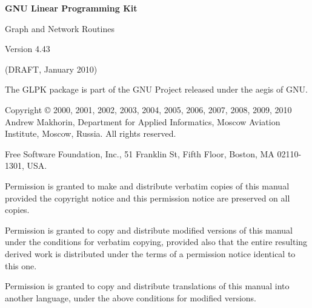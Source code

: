 \documentclass[dvipdfm,11pt]{report}
\begin{document}
\thispagestyle{empty}

\begin{center}

\vspace*{1in}

\begin{huge}
\sf\bfseries GNU Linear Programming Kit
\end{huge}

\vspace{0.5in}

\begin{LARGE}
\sf Graph and Network Routines
\end{LARGE}

\vspace{0.5in}

\begin{LARGE}
\sf Version 4.43
\end{LARGE}

\vspace{0.5in}
\begin{Large}
\sf (DRAFT, January 2010)
\end{Large}
\end{center}

\newpage

\vspace*{1in}

\vfill

\noindent
The GLPK package is part of the GNU Project released under the aegis of
GNU.

\medskip \noindent
Copyright \copyright{} 2000, 2001, 2002, 2003, 2004, 2005, 2006, 2007,
2008, 2009, 2010 Andrew Makhorin, Department for Applied Informatics,
Moscow Aviation Institute, Moscow, Russia. All rights reserved.

\medskip \noindent
Free Software Foundation, Inc., 51 Franklin St, Fifth Floor, Boston, MA
02110-1301, USA.

\medskip \noindent
Permission is granted to make and distribute verbatim copies of this
manual provided the copyright notice and this permission notice are
preserved on all copies.

\medskip \noindent
Permission is granted to copy and distribute modified versions of this
manual under the conditions for verbatim copying, provided also that the
entire resulting derived work is distributed under the terms of
a permission notice identical to this one.

\medskip \noindent
Permission is granted to copy and distribute translations of this manual
into another language, under the above conditions for modified versions.
\end{document}
